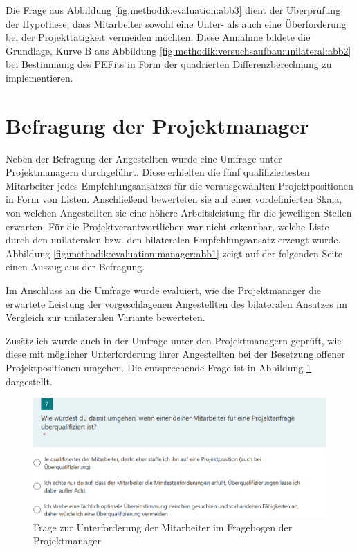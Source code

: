Die Frage aus Abbildung \ref{fig:methodik:evaluation:abb3} dient der Überprüfung der Hypothese, dass Mitarbeiter sowohl eine Unter- als auch eine Überforderung bei der Projekttätigkeit vermeiden möchten. Diese Annahme bildete die Grundlage, Kurve B aus Abbildung \ref{fig:methodik:versuchsaufbau:unilateral:abb2} bei Bestimmung des \acp{PEFit} in Form der quadrierten Differenzberechnung zu implementieren.

\section{Befragung der Projektmanager}
\label{ch:methodik:evaluation:manager}
Neben der Befragung der Angestellten wurde eine Umfrage unter Projektmanagern durchgeführt. Diese erhielten die fünf qualifiziertesten Mitarbeiter jedes Empfehlungsansatzes für die vorausgewählten Projektpositionen in Form von Listen. Anschließend bewerteten sie auf einer vordefinierten Skala, von welchen Angestellten sie eine höhere Arbeitsleistung für die jeweiligen Stellen erwarten. Für die Projektverantwortlichen war nicht erkennbar,  welche Liste durch den unilateralen bzw. den bilateralen Empfehlungsansatz erzeugt wurde. Abbildung \ref{fig:methodik:evaluation:manager:abb1} zeigt auf der folgenden Seite einen Auszug aus der Befragung.

Im Anschluss an die Umfrage wurde evaluiert, wie die Projektmanager die erwartete Leistung der vorgeschlagenen Angestellten des bilateralen Ansatzes im Vergleich zur unilateralen Variante bewerteten.

Zusätzlich wurde auch in der Umfrage unter den Projektmanagern geprüft, wie diese mit möglicher Unterforderung ihrer Angestellten bei der Besetzung offener Projektpositionen umgehen. Die entsprechende Frage ist in Abbildung \ref{fig:methodik:evaluation:manager:abb3} dargestellt.

\begin{figure}[h]
	\centering
	\includegraphics[width=1\textwidth]{gfx/umfrage-projektmanager-unterforderung.png}
	\caption{Frage zur Unterforderung der Mitarbeiter im Fragebogen der Projektmanager}
	\label{fig:methodik:evaluation:manager:abb3}
\end{figure}


